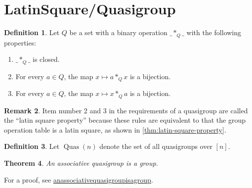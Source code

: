 \documentclass[a4paper, 12pt, english]{article}
\theoremstyle{plain}
\newtheorem{theorem}{Theorem}[section]
\theoremstyle{definition}
\newtheorem{definition}[theorem]{Definition}
\newtheorem{remark}[theorem]{Remark}
\DeclareMathOperator{\Quas}{Quas}
\begin{document}
\section{LatinSquare/Quasigroup}

\begin{definition}
    Let \( Q \) be a set with a binary operation \( \_ *_Q \_ \) with the following properties:
    \begin{enumerate}
        \item \( \_ *_Q \_ \) is closed.
        \item For every \( a \in Q \), the map \( x \mapsto a *_Q x \) is a bijection.
        \item For every \( a \in Q \), the map \( x \mapsto x *_Q a \) is a bijection.
    \end{enumerate}
\end{definition}

\begin{remark}
    Item number 2 and 3 in the requirements of a quasigroup are called the ``latin square property'' because these rules are equivalent to that the group operation table is a latin square, as shown in \autoref{thm:latin-square-property}.
\end{remark}

\begin{definition}
    Let \( \Quas(n) \) denote the set of all quasigroups over \( [n] \).
\end{definition}

\begin{theorem} \label{thm:associative-quasigroup-group}
    An associative quasigroup is a group.
\end{theorem}
For a proof, see \href{https://www.planetmath.org/anassociativequasigroupisagroup}{anassociativequasigroupisagroup}.
\end{document}
